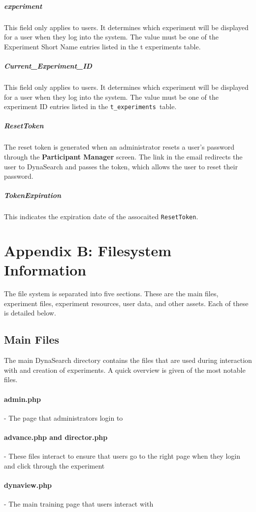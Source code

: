 \documentclass[article]{ij4uq}              %
\begin{document}
\subparagraph{experiment}
This field only applies to users. It determines which experiment will be displayed for a user when they log into the system. The value must be one of the Experiment Short Name entries listed in the t experiments table. 

\subparagraph{Current\_Experiment\_ID}
This field only applies to users. It determines which experiment will be displayed for a user when they log into the system. The value must be one of the experiment ID entries listed in the \texttt{t\_experiments }table. 

\subparagraph{ResetToken}
The reset token is generated when an administrator resets a user's password through the \textbf{Participant Manager} screen.  The link in the email redirects the user to DynaSearch and passes the token, which allows the user to reset their password.

\subparagraph{TokenExpiration}
This indicates the expiration date of the assocaited \texttt{ResetToken}.

\section{Appendix B: Filesystem Information}
The file system is separated into five sections. These are the main files, experiment files, experiment resources, user data, and other assets. Each of these is detailed below.

\subsection{Main Files}
The main DynaSearch directory contains the files that are used during interaction with and creation of experiments. A quick overview is given of the most notable files.

\paragraph{admin.php} - The page that administrators login to

\paragraph{advance.php and director.php} - These files interact to ensure that users go to the right page when they login and click through the experiment

\paragraph{dynaview.php} - The main training page that users interact with
\end{document}
